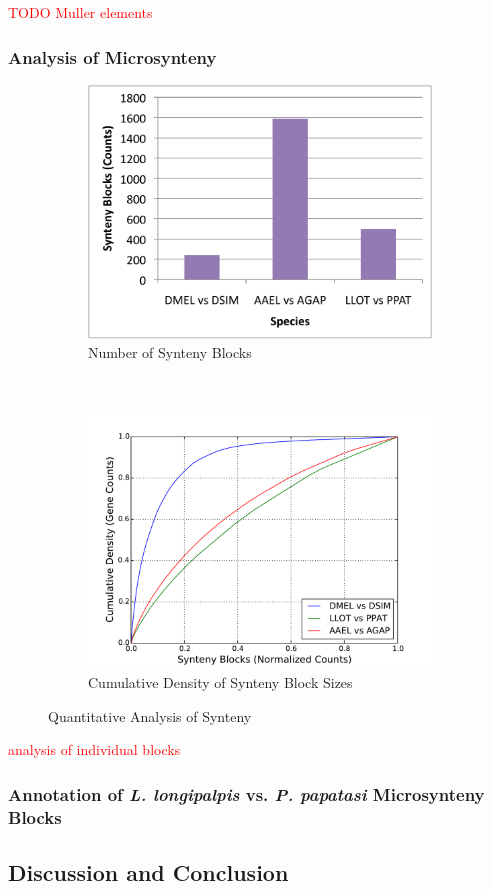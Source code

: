\textcolor{red}{TODO Muller elements}

\subsubsection{Analysis of Microsynteny}

\begin{figure}[H]
  \centering
  \begin{subfigure}[b]{0.45\textwidth}
    \includegraphics[width=\textwidth]{figures/synteny/block_counts}
    \caption{Number of Synteny Blocks}
    \label{fig:synteny-dist-counts}
  \end{subfigure}
  ~
  \begin{subfigure}[b]{0.45\textwidth}
    \includegraphics[width=\textwidth]{figures/synteny/sandflies_mosquitoes_drosophila_orth_cdf}
    \caption{Cumulative Density of Synteny Block Sizes}
    \label{fig:synteny-dist-cdf}
  \end{subfigure}
\label{fig:synteny-dist}
\caption{Quantitative Analysis of Synteny}
\end{figure}

\textcolor{red}{analysis of individual blocks}

\subsubsection{Annotation of \emph{L. longipalpis} vs. \emph{P. papatasi} Microsynteny Blocks}

\subsection{Discussion and Conclusion}